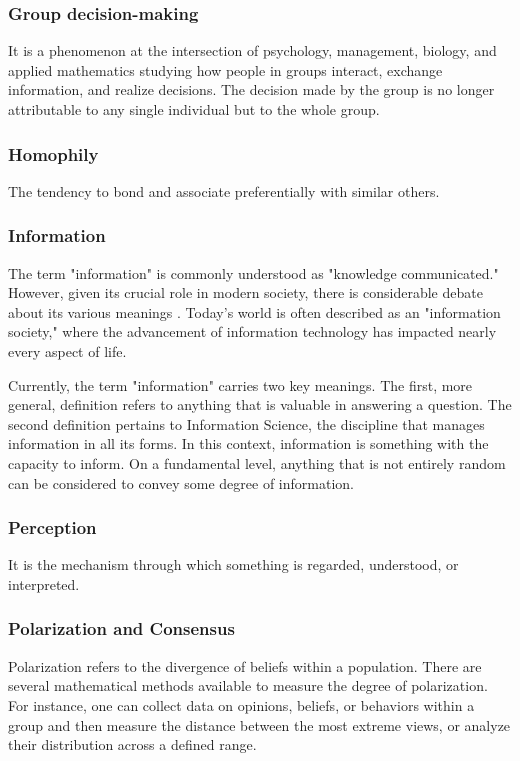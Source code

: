 \subsubsection{Group decision-making} It is a phenomenon at the intersection of psychology, management, biology, and applied mathematics studying how people in groups interact, exchange information, and realize decisions. The decision made by the group is no longer attributable to any single individual but to the whole group. 

\subsubsection{Homophily} The tendency to bond and associate preferentially with similar others. 

\subsubsection{Information} The term "information" is commonly understood as "knowledge communicated." However, given its crucial role in modern society, there is considerable debate about its various meanings \cite{Capurro_2003}. Today’s world is often described as an "information society," where the advancement of information technology has impacted nearly every aspect of life.

Currently, the term "information" carries two key meanings. The first, more general, definition refers to anything that is valuable in answering a question. The second definition pertains to Information Science, the discipline that manages information in all its forms. In this context, information is something with the capacity to inform. On a fundamental level, anything that is not entirely random can be considered to convey some degree of information. 

\subsubsection{Perception} It is the mechanism through which something is regarded, understood, or interpreted.

\subsubsection{Polarization and Consensus}

Polarization refers to the divergence of beliefs within a population. There are several mathematical methods available to measure the degree of polarization. For instance, one can collect data on opinions, beliefs, or behaviors within a group and then measure the distance between the most extreme views, or analyze their distribution across a defined range.

